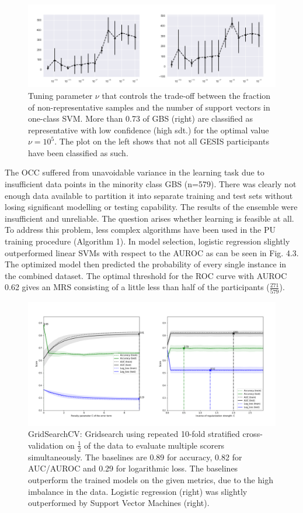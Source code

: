 \begin{figure}[ht]
\centering
   \includegraphics[scale=0.38,angle=0]{fig/occfigure}
\captionsetup{width= 380pt}
\caption{Tuning parameter \(\nu\) that controls the trade-off between the fraction of non-representative samples and the number of support vectors in one-class SVM. More than 0.73 of GBS (right) are classified as representative with low confidence (high sdt.) for the optimal value \( \nu = 10^5\). The plot on the left shows that not all GESIS participants have been classified as such.} 
\end{figure}

The OCC suffered from unavoidable variance in the learning task due to insufficient data points in the minority class GBS (n=579). There was clearly not enough data available to partition it into separate training and test sets without losing significant modelling or testing capability. The results of the ensemble were insufficient and unreliable. The question arises whether learning is feasible at all. To address this problem, less complex algorithms have been used in the PU training procedure (Algorithm 1). In model selection, logistic regression slightly outperformed linear SVMs with respect to the AUROC as can be seen in Fig. 4.3. The optimized model then predicted the probability of every single instance in the combined dataset. The optimal threshold for the ROC curve with AUROC 0.62 gives an MRS consisting of a little less than half of the participants (\(\frac{271}{579}\)).

\begin{figure}[ht]
\centering
   \includegraphics[scale=0.38,angle=0]{fig/gridfigure}
\captionsetup{width= 400pt}
\caption{GridSearchCV: Gridsearch using repeated 10-fold stratified cross-validation on \(\frac{1}{2}\) of the data to evaluate multiple scorers simultaneously. The baselines are 0.89 for accuracy, 0.82 for AUC/AUROC and 0.29 for logarithmic loss. The baselines outperform the trained models on the given metrics, due to the high imbalance in the data. Logistic regression (right) was slightly outperformed by Support Vector Machines (right).}
   \label{fig:Ng1} 
\end{figure}

